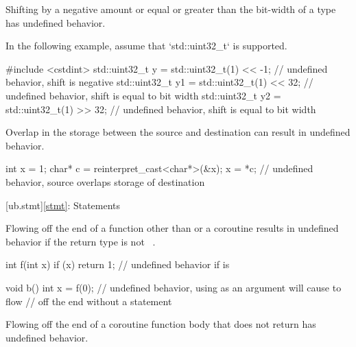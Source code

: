 
\pnum
Shifting by a negative amount or equal or greater than
the bit-width of a type has undefined behavior.

\pnum
\begin{example}
In the following example, assume that
`std::uint32_t` is supported.
\begin{codeblock}
#include <cstdint>
std::uint32_t y = std::uint32_t(1) << -1;   // undefined behavior, shift is negative
std::uint32_t y1 = std::uint32_t(1) << 32;  // undefined behavior, shift is equal to bit width
std::uint32_t y2 = std::uint32_t(1) >> 32;  // undefined behavior, shift is equal to bit width
\end{codeblock}
\end{example}


\pnum
Overlap in the storage between the source and destination
can result in undefined behavior.

\pnum
\begin{example}
\begin{codeblock}
int x = 1;
char* c = reinterpret_cast<char*>(&x);
x = *c;         // undefined behavior, source overlaps storage of destination
\end{codeblock}
\end{example}

[ub.stmt]{\ref*{stmt}: Statements}


\pnum
Flowing off the end of a function other
than  or a coroutine results in undefined behavior if the return type
is not \cv{}~.

\pnum
\begin{example}
\begin{codeblock}
int f(int x) {
  if (x)
    return 1;
  // undefined behavior if  is 
}

void b() {
  int x = f(0); // undefined behavior, using  as an argument will cause  to flow
                // off the end without a  statement
}
\end{codeblock}
\end{example}


\pnum
Flowing off the end of a coroutine function body
that does not return  has undefined behavior.

